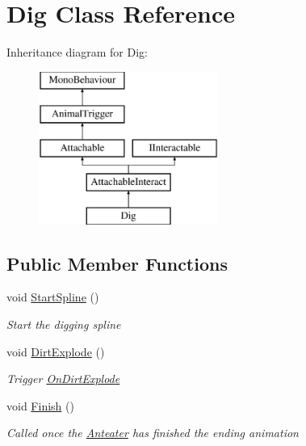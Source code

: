 \hypertarget{class_dig}{}\section{Dig Class Reference}
\label{class_dig}
Inheritance diagram for Dig\+:\begin{figure}[H]
\begin{center}
\leavevmode
\includegraphics[height=5.000000cm]{class_dig}
\end{center}
\end{figure}
\subsection*{Public Member Functions}
\begin{DoxyCompactItemize}
\item 
void \mbox{\hyperlink{class_dig_ad8530d5a6d6c5ae296f722f3d2a618d4}{Start\+Spline}} ()
\begin{DoxyCompactList}\small\item\em Start the digging spline \end{DoxyCompactList}\item 
void \mbox{\hyperlink{class_dig_a75281eb5b1b5803c8f01b3ac8509cb51}{Dirt\+Explode}} ()
\begin{DoxyCompactList}\small\item\em Trigger \mbox{\hyperlink{class_dig_a02ef58f6d518aa38c5a21cb0409738e7}{On\+Dirt\+Explode}} \end{DoxyCompactList}\item 
void \mbox{\hyperlink{class_dig_a41a34352c7a9451667d16ae3bc8adfee}{Finish}} ()
\begin{DoxyCompactList}\small\item\em Called once the \mbox{\hyperlink{class_anteater}{Anteater}} has finished the ending animation \end{DoxyCompactList}\end{DoxyCompactItemize}

